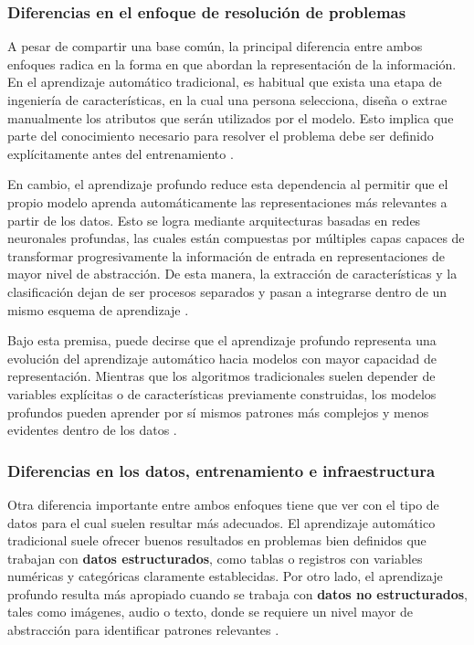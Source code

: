 \subsubsection{Diferencias en el enfoque de resolución de problemas}

A pesar de compartir una base común, la principal diferencia entre ambos enfoques radica en la forma en que abordan la representación de la información. En el aprendizaje automático tradicional, es habitual que exista una etapa de ingeniería de características, en la cual una persona selecciona, diseña o extrae manualmente los atributos que serán utilizados por el modelo. Esto implica que parte del conocimiento necesario para resolver el problema debe ser definido explícitamente antes del entrenamiento \cite{aws2026ml_vs_dl}.

En cambio, el aprendizaje profundo reduce esta dependencia al permitir que el propio modelo aprenda automáticamente las representaciones más relevantes a partir de los datos. Esto se logra mediante arquitecturas basadas en redes neuronales profundas, las cuales están compuestas por múltiples capas capaces de transformar progresivamente la información de entrada en representaciones de mayor nivel de abstracción. De esta manera, la extracción de características y la clasificación dejan de ser procesos separados y pasan a integrarse dentro de un mismo esquema de aprendizaje \cite{aws2026ml_vs_dl}.

Bajo esta premisa, puede decirse que el aprendizaje profundo representa una evolución del aprendizaje automático hacia modelos con mayor capacidad de representación. Mientras que los algoritmos tradicionales suelen depender de variables explícitas o de características previamente construidas, los modelos profundos pueden aprender por sí mismos patrones más complejos y menos evidentes dentro de los datos \cite{aws2026ml_vs_dl}.

\subsubsection{Diferencias en los datos, entrenamiento e infraestructura}

Otra diferencia importante entre ambos enfoques tiene que ver con el tipo de datos para el cual suelen resultar más adecuados. El aprendizaje automático tradicional suele ofrecer buenos resultados en problemas bien definidos que trabajan con \textbf{datos estructurados}, como tablas o registros con variables numéricas y categóricas claramente establecidas. Por otro lado, el aprendizaje profundo resulta más apropiado cuando se trabaja con \textbf{datos no estructurados}, tales como imágenes, audio o texto, donde se requiere un nivel mayor de abstracción para identificar patrones relevantes \cite{aws2026ml_vs_dl}.

